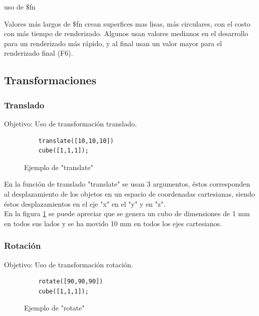 \documentclass{article}
\begin{document}
    
    uso de $\$$fn
    
    Valores más largos de $\$$fn crean superfices mas lisas, más circulares, con el costo con más tiempo de renderizado. Algunos usan valores medianos en el desarrollo para un renderizado más rápido, y al final usan un valor mayor para el renderizado final (F6).\\
    

    
\subsection{Transformaciones}

\subsubsection{Translado}

Objetivo: Uso de transformación translado.\citep{OpenSCS}\\

\begin{figure}
    \centering
   \begin{verbatim}
    translate([10,10,10])
    cube([1,1,1]);
\end{verbatim}
    \caption{Ejemplo de "translate"}
    \label{fig:trans}
\end{figure}


En la función de translado "translate" se usan 3 argumentos, éstos corresponden al desplazamiento de los objetos en un espacio de coordenadas cartesianas, siendo éstos desplazamientos en el eje "x" en el "y" y en "z".\\

En la figura \ref{fig:trans} se puede apreciar que se genera un cubo de dimensiones de 1 mm en todos sus lados y se ha movido 10 mm en todos los ejes cartesianos.\\


\subsubsection{Rotación}

Objetivo: Uso de transformación rotación. \citep{OpenSCS}\\

\begin{figure}
    \centering
   \begin{verbatim}
    rotate([90,90,90])
    cube([1,1,1]);
\end{verbatim}
    \caption{Ejemplo de "rotate"}
    \label{fig:rot}
\end{figure}
\end{document}

